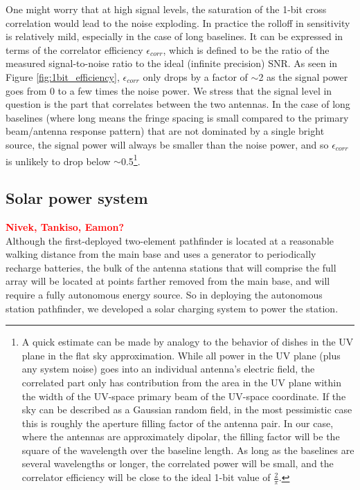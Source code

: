 \documentclass{ws-jai}
\newcommand{\attention}[1]{\textcolor{red}{\bf {#1}}}
\begin{document}
One might worry that at high signal levels, the saturation of the 1-bit cross correlation would lead to the noise exploding.  In practice the rolloff in sensitivity is relatively mild, especially in the case of long baselines.  It can be expressed in terms of the correlator efficiency $\epsilon_{corr}$, which is defined to be the ratio of the measured signal-to-noise ratio to the ideal (infinite precision) SNR.  As seen in Figure \ref{fig:1bit_efficiency}, $\epsilon_{corr}$ only drops by a factor of $\sim$2 as the signal power goes from 0 to a few times the noise power.  We stress that the signal level in question is the part that correlates between the two antennas.  In the case of long baselines (where long means the fringe spacing is small compared to the primary beam/antenna response pattern) that are not dominated by a single bright source, the signal power will always be smaller than the noise power, and so $\epsilon_{corr}$ is unlikely to drop below $\sim$0.5\footnote{A quick estimate can be made by analogy to the behavior of dishes in the UV plane in the flat sky approximation.  While all power in the UV plane (plus any system noise) goes into an individual antenna's electric field, the correlated part only has contribution from the area in the UV plane within the width of the UV-space primary beam of the UV-space coordinate.  If the sky can be described as a Gaussian random field, in the most pessimistic case this is roughly the aperture filling factor of the antenna pair.  In our case, where the antennas are approximately dipolar, the filling factor will be the square of the wavelength over the baseline length.  As long as the baselines are several wavelengths or longer, the correlated power will be small, and the correlator efficiency will be close to the ideal 1-bit value of $\frac{2}{\pi}$.}.


\subsection{Solar power system}
\attention{Nivek, Tankiso, Eamon?} \\
Although the first-deployed two-element pathfinder is located at a reasonable walking distance from the main base and uses a generator to periodically recharge batteries, the bulk of the antenna stations that will comprise the full array will be located at points farther removed from the main base, and will require a fully autonomous energy source. So in deploying the autonomous station pathfinder, we developed a solar charging system to power the station.
\end{document}
